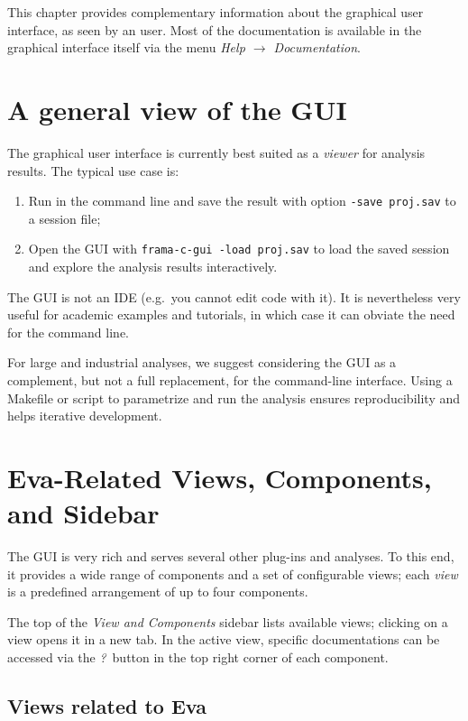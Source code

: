 This chapter provides complementary information about the graphical user
interface, as seen by an \Eva{} user. Most of the documentation is available
in the graphical interface itself via the menu
\emph{Help $\rightarrow$ Documentation}.

\section{A general view of the GUI}

The \FramaC graphical user interface is currently best suited as a
{\em viewer} for analysis results. The typical use case is:

\begin{enumerate}
\item Run \FramaC in the command line and save the result
with option \texttt{-save proj.sav} to a session file;
\item Open the GUI with \texttt{frama-c-gui -load proj.sav} to load the saved session and
explore the analysis results interactively.
\end{enumerate}

The \FramaC GUI is not an IDE (e.g.~you cannot edit code with it). It is nevertheless very useful for academic examples and tutorials,
in which case it can obviate the need for the command line.

For large and industrial analyses, we suggest considering the GUI as a
complement, but not a full replacement, for the command-line interface.
Using a Makefile or script to parametrize and run the analysis ensures
reproducibility and helps iterative development.

\section{Eva-Related Views, Components, and Sidebar}

The \FramaC GUI is very rich and serves several other plug-ins and analyses.
To this end, it provides a wide range of components and a set of configurable
views; each {\em view} is a predefined arrangement of up to four components.

The top of the \emph{View and Components} sidebar lists available views;
clicking on a view opens it in a new tab.
In the active view, specific documentations can be accessed via the
\emph{?} button in the top right corner of each component.

\subsection{Views related to Eva}

